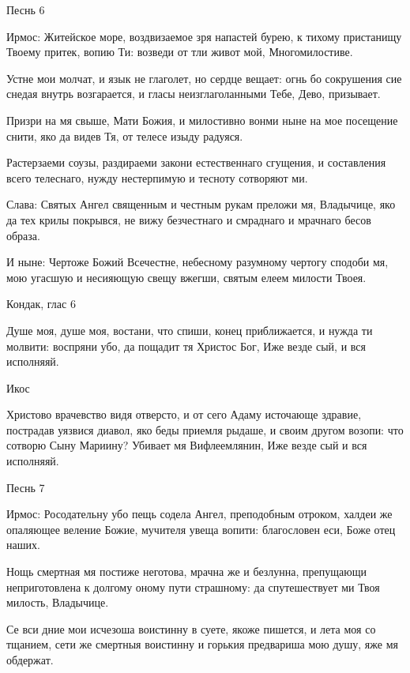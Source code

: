 \bfseries \itshape 


Песнь 6\normalfont{}\normalfont{}


Ирмос: Житейское море, воздвизаемое зря напастей бурею, к тихому пристанищу Твоему притек, вопию Ти: возведи от тли живот мой, Многомилостиве.





Устне мои молчат, и язык не глаголет, но сердце вещает: огнь бо сокрушения сие снедая внутрь возгарается, и гласы неизглаголанными Тебе, Дево, призывает.


Призри на мя свыше, Мати Божия, и милостивно вонми ныне на мое посещение снити, яко да видев Тя, от телесе изыду радуяся.


Растерзаеми соузы, раздираеми закони естественнаго сгущения, и составления всего телеснаго, нужду нестерпимую и тесноту сотворяют ми.


Слава: Святых Ангел священным и честным рукам преложи мя, Владычице, яко да тех крилы покрывся, не вижу безчестнаго и смраднаго и мрачнаго бесов образа.


И ныне: Чертоже Божий Всечестне, небесному разумному чертогу сподоби мя, мою угасшую и несияющую свещу вжегши, святым елеем милости Твоея.


Кондак, глас 6


Душе моя, душе моя, востани, что спиши, конец приближается, и нужда ти молвити: воспряни убо, да пощадит тя Христос Бог, Иже везде сый, и вся исполняяй.


Икос


Христово врачевство видя отверсто, и от сего Адаму источающе здравие, пострадав уязвися диавол, яко беды приемля рыдаше, и своим другом возопи: что сотворю Сыну Мариину? Убивает мя Вифлеемлянин, Иже везде сый и вся исполняяй.


\bfseries \itshape 


Песнь 7\normalfont{}\normalfont{}


Ирмос: Росодательну убо пещь содела Ангел, преподобным отроком, халдеи же опаляющее веление Божие, мучителя увеща вопити: благословен еси, Боже отец наших.





Нощь смертная мя постиже неготова, мрачна же и безлунна, препущающи неприготовлена к долгому оному пути страшному: да спутешествует ми Твоя милость, Владычице.


Се вси дние мои исчезоша воистинну в суете, якоже пишется, и лета моя со тщанием, сети же смертныя воистинну и горькия предвариша мою душу, яже мя обдержат.


